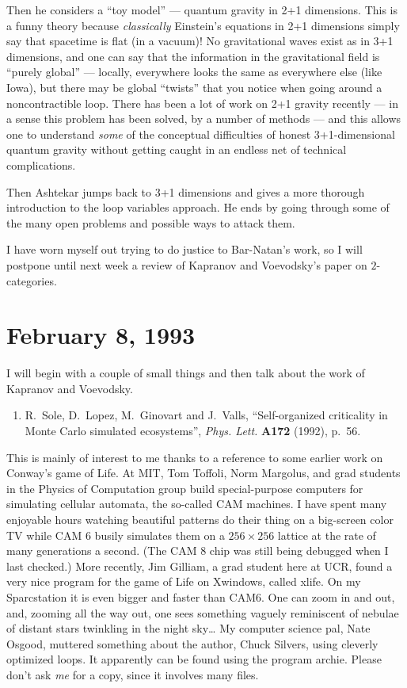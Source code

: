 \documentclass[12pt]{article}
\def\tightlist{}
\begin{document}
Then he considers a ``toy model'' --- quantum gravity in 2+1 dimensions.
This is a funny theory because \emph{classically} Einstein's equations
in 2+1 dimensions simply say that spacetime is flat (in a vacuum)! No
gravitational waves exist as in 3+1 dimensions, and one can say that the
information in the gravitational field is ``purely global'' --- locally,
everywhere looks the same as everywhere else (like Iowa), but there may
be global ``twists'' that you notice when going around a noncontractible
loop. There has been a lot of work on 2+1 gravity recently --- in a
sense this problem has been solved, by a number of methods --- and this
allows one to understand \emph{some} of the conceptual difficulties of
honest 3+1-dimensional quantum gravity without getting caught in an
endless net of technical complications.

Then Ashtekar jumps back to 3+1 dimensions and gives a more thorough
introduction to the loop variables approach. He ends by going through
some of the many open problems and possible ways to attack them.

I have worn myself out trying to do justice to Bar-Natan's work, so I
will postpone until next week a review of Kapranov and Voevodsky's paper
on \(2\)-categories.



\hypertarget{week4}{%
\section{February 8, 1993}\label{week4}}

I will begin with a couple of small things and then talk about the work
of Kapranov and Voevodsky.

\begin{enumerate}
\def\labelenumi{\arabic{enumi})}
\tightlist
\item
  R.\ Sole, D.\ Lopez, M.\ Ginovart and J.\ Valls, ``Self-organized criticality in Monte Carlo 
  simulated ecosystems'', \emph{Phys. Lett.}
  \textbf{A172} (1992), p.~56.
\end{enumerate}

This is mainly of interest to me thanks to a reference to some earlier
work on Conway's game of Life. At MIT, Tom Toffoli, Norm Margolus, and
grad students in the Physics of Computation group build special-purpose
computers for simulating cellular automata, the so-called CAM machines.
I have spent many enjoyable hours watching beautiful patterns do their
thing on a big-screen color TV while CAM 6 busily simulates them on a
\(256 \times 256\) lattice at the rate of many generations a second.
(The CAM 8 chip was still being debugged when I last checked.) More
recently, Jim Gilliam, a grad student here at UCR, found a very nice
program for the game of Life on Xwindows, called xlife. On my
Sparcstation it is even bigger and faster than CAM6. One can zoom in and
out, and, zooming all the way out, one sees something vaguely
reminiscent of nebulae of distant stars twinkling in the night
sky\ldots{} My computer science pal, Nate Osgood, muttered something
about the author, Chuck Silvers, using
cleverly optimized loops. It apparently can be found using the program
archie. Please don't ask \emph{me} for a copy, since it involves many
files.
\end{document}
